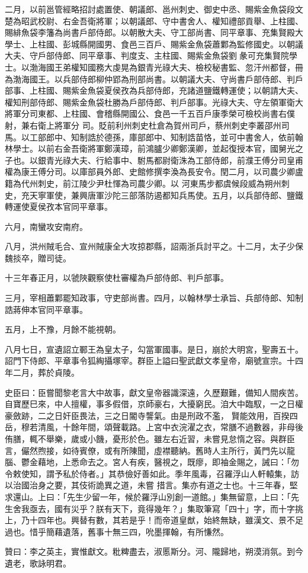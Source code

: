 \begin{pinyinscope}
 二月，以前邕管經略招討處置使、朝議郎、邕州刺史、御史中丞、賜紫金魚袋段文楚為昭武校尉、右金吾衛將軍；以朝議郎、守中書舍人、權知禮部貢舉、上柱國、賜緋魚袋李籓為尚書戶部侍郎。以朝散大夫、守工部尚書、同平章事、充集賢殿大學士、上柱國、彭城縣開國男、食邑三百戶、賜紫金魚袋蕭鄴為監修國史。以朝議大夫、守戶部侍郎、同平章事、判度支、主柱國、賜紫金魚袋劉彖可充集賢院學
 士。以渤海國王弟權知國務大虔晃為銀青光祿大夫、檢校秘書監、忽汗州都督，冊為渤海國王。以兵部侍郎柳仲郢為刑部尚書。以朝議大夫、守尚書戶部侍郎、判戶部事、上柱國、賜紫金魚袋夏侯孜為兵部侍郎，充諸道鹽鐵轉運使；以朝請大夫、權知刑部侍郎、賜紫金魚袋杜勝為戶部侍郎、判戶部事。光祿大夫、守左領軍衛大將軍分司東都、上柱國、會稽縣開國公、食邑一千五百戶康季榮可檢校尚書右僕射，兼右衛上將軍分
 司。貶前利州刺史杜倉為賀州司戶，蔡州刺史李叢邵州司馬。以工部郎中、知制誥於德孫，庫部郎中、知制誥苗恪，並可中書舍人，依前翰林學士。以前右金吾衛將軍鄭漢璋，前鴻臚少卿鄭漢卿，並起復授本官，國舅光之子也。以銀青光祿大夫、行給事中、駙馬都尉衛洙為工部侍郎，前濮王傅分司皇甫權為康王傅分司。以庫部員外郎、史館修撰李渙為長安令。閏二月，以司農少卿盧籍為代州刺史，前江陵少尹杜惲為司農少卿。以
 河東馬步都虞候段威為朔州刺史，充天寧軍使，兼興唐軍沙陀三部落防遏都知兵馬使。五月，以兵部侍郎、鹽鐵轉運使夏侯孜本官同平章事。



 六月，南蠻攻安南府。



 八月，洪州賊毛合、宣州賊康全大攻掠郡縣，詔兩浙兵討平之。十二月，太子少保魏掞卒，贈司徒。



 十三年春正月，以虢陜觀察使杜審權為戶部侍郎、判戶部事。



 三月，宰相蕭鄴罷知政事，守吏部尚書。四月，以翰林學士承旨、兵部侍郎、知制誥蔣伸本官同平章事。



 五月，上不豫，月餘不能視朝。



 八月七日，宣遺詔立鄆王為皇太子，勾當軍國事。是日，崩於大明宮，聖壽五十。詔門下侍郎、平章事令狐綯攝塚宰。群臣上謚曰聖武獻文孝皇帝，廟號宣宗。十四年二月，葬於貞陵。



 史臣曰：臣嘗聞黎老言大中故事，獻文皇帝器識深遠，久歷艱難，備知人間疾苦。自寶歷巳來，中人擅權，事多假借，京師豪右，大擾窮民。洎大中臨馭，一之日權豪斂跡，二之日奸臣畏法，三之日閽寺讋氣。由是刑政不濫，
 賢能效用，百揆四岳，穆若清風，十餘年間，頌聲載路。上宮中衣浣濯之衣，常膳不過數器，非母後侑膳，輒不舉樂，歲或小饑，憂形於色。雖左右近習，未嘗見怠惰之容。與群臣言，儼然煦接，如待賓僚，或有所陳聞，虛襟聽納。舊時人主所行，黃門先以龍腦、鬱金藉地，上悉命去之。宮人有疾，醫視之，既瘳，即袖金賜之，誡曰：「勿令敕使知，謂予私於侍者。」其恭儉好善如此。季年風毒，召羅浮山人軒轅集，訪以治國治身之要，其伎術詭異之道，未嘗
 措言。集亦有道之士也。十三年春，堅求還山。上曰：「先生少留一年，候於羅浮山別創一道館。」集無留意，上曰：「先生舍我亟去，國有災乎？朕有天下，竟得幾年？」集取筆寫「四十」字，而十字挑上，乃十四年也。興替有數，其若是乎！而帝道皇猷，始終無缺，雖漢文、景不足過也。惜乎簡藉遺落，舊事十無三四，吮墨揮翰，有所慊然。



 贊曰：李之英主，實惟獻文。粃粺盡去，淑慝斯分。河、隴歸地，朔漠消氛。到今遺老，歌詠明君。



\end{pinyinscope}